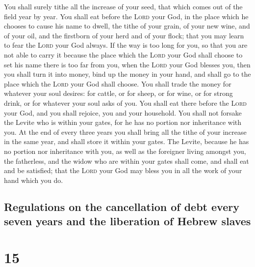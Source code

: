  You shall surely tithe all the increase of your seed,
that which comes out of the field year by year.  You
shall eat before the \textsc{Lord} your God, in the place which he
chooses to cause his name to dwell, the tithe of your grain, of your new
wine, and of your oil, and the firstborn of your herd and of your flock;
that you may learn to fear the \textsc{Lord} your God always.
 If the way is too long for you, so that you are not able
to carry it because the place which the \textsc{Lord} your God shall
choose to set his name there is too far from you, when the \textsc{Lord}
your God blesses you,  then you shall turn it into money,
bind up the money in your hand, and shall go to the place which the
\textsc{Lord} your God shall choose.  You shall trade the
money for whatever your soul desires: for cattle, or for sheep, or for
wine, or for strong drink, or for whatever your soul asks of you. You
shall eat there before the \textsc{Lord} your God, and you shall
rejoice, you and your household.  You shall not forsake
the Levite who is within your gates, for he has no portion nor
inheritance with you.  At the end of every three years
you shall bring all the tithe of your increase in the same year, and
shall store it within your gates.  The Levite, because he
has no portion nor inheritance with you, as well as the foreigner living
amongst you, the fatherless, and the widow who are within your gates
shall come, and shall eat and be satisfied; that the \textsc{Lord} your
God may bless you in all the work of your hand which you do.

\hypertarget{regulations-on-the-cancellation-of-debt-every-seven-years-and-the-liberation-of-hebrew-slaves}{%
\subsection{Regulations on the cancellation of debt every seven years
and the liberation of Hebrew
slaves}\label{regulations-on-the-cancellation-of-debt-every-seven-years-and-the-liberation-of-hebrew-slaves}}

\hypertarget{section-14}{%
\section{15}\label{section-14}}

